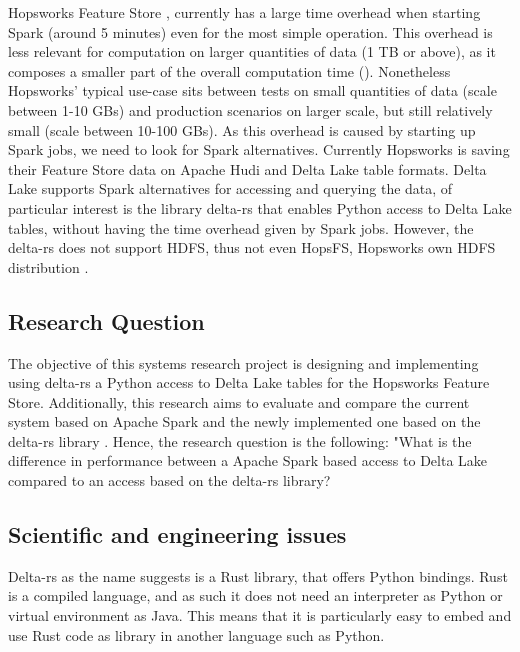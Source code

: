 Hopsworks Feature Store \cite{HopsworksBatchRealtime2024}, currently has a large time overhead when starting Spark (around 5 minutes) even for the most simple operation. 
This overhead is less relevant for computation on larger quantities of data (1 TB or above), as it composes a smaller part of the overall computation time (). %
Nonetheless Hopsworks' typical use-case sits between tests on small quantities of data (scale between 1-10 GBs) and production scenarios on larger scale, but still relatively small (scale between 10-100 GBs). %
As this overhead is caused by starting up Spark jobs, we need to look for Spark alternatives. Currently Hopsworks is saving their Feature Store data on Apache Hudi and Delta Lake table formats. Delta Lake supports Spark alternatives for accessing and querying the data, of particular interest is the library delta-rs \cite{DeltaioDeltars2024} that enables Python access to Delta Lake tables, without having the time overhead given by Spark jobs. 
However, the delta-rs \cite{DeltaioDeltars2024} does not support \gls{HDFS}, thus not even HopsFS, Hopsworks own \gls{HDFS} distribution \cite{niaziHopsFSScalingHierarchical2017}.

\subsection{Research Question}
\label{sec:researchQuestion}
The objective of this systems research project is designing and implementing using delta-rs \cite{DeltaioDeltars2024} a Python access to Delta Lake tables for the Hopsworks Feature Store. Additionally, this research aims to evaluate and compare the current system based on Apache Spark and the newly implemented one based on the delta-rs library \cite{DeltaioDeltars2024}. Hence, the research question is the following: "What is the difference in performance between a Apache Spark based access to Delta Lake compared to an access based on the delta-rs library?


\subsection{Scientific and engineering issues}
Delta-rs \cite{DeltaioDeltars2024} as the name suggests is a Rust \cite{RustProgrammingLanguage} library, that offers Python bindings. Rust is a compiled language, and as such it does not need an interpreter as Python or virtual environment as Java. This means that it is particularly easy to embed and use Rust code as library in another language such as Python. 

